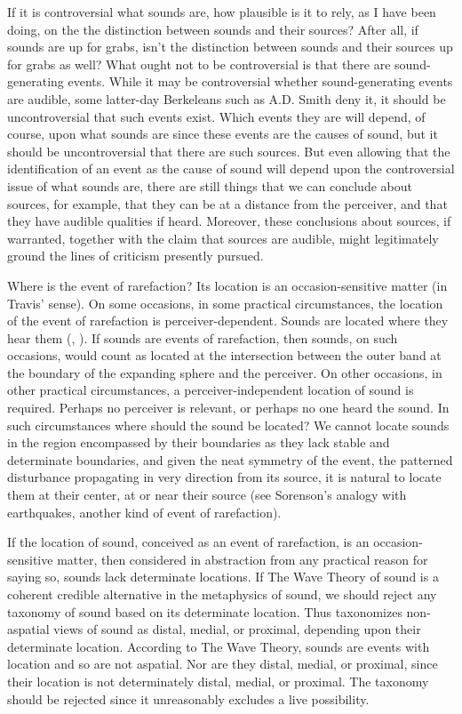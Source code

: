 \documentclass[12pt]{article}
\begin{document}
If it is controversial what sounds are, how plausible is it to rely, as I have been doing, on the the distinction between sounds and their sources? After all, if sounds are up for grabs, isn’t the distinction between sounds and their sources up for grabs as well? What ought not to be controversial is that there are sound-generating events. While it may be controversial whether sound-generating events are audible, some latter-day Berkeleans such as A.D. Smith \citeyearpar{Smith:2002sa} deny it, it should be uncontroversial that such events exist. Which events they are will depend, of course, upon what sounds are since these events are the causes of sound, but it should be uncontroversial that there are such sources. But even allowing that the identification of an event as the cause of sound will depend upon the controversial issue of what sounds are, there are still things that we can conclude about sources, for example, that they can be at a distance from the perceiver, and that they have audible qualities if heard. Moreover, these conclusions about sources, if warranted, together with the claim that sources are audible, might legitimately ground the lines of criticism presently pursued. 

Where is the event of rarefaction? Its location is an occasion-sensitive matter (in Travis' \citeyear{Travis:2008la} sense). On some occasions, in some practical circumstances, the location of the event of rarefaction is perceiver-dependent. Sounds are located where they hear them (\citealt{Nudds:2009sf}, \citealt{OShaughnessy:2009aa}). If sounds are events of rarefaction, then sounds, on such occasions, would count as located at the intersection between the outer band at the boundary of the expanding sphere and the perceiver. On other occasions, in other practical circumstances, a perceiver-independent location of sound is required. Perhaps no perceiver is relevant, or perhaps no one heard the sound. In such circumstances where should the sound be located? We cannot locate sounds in the region encompassed by their boundaries as they lack stable and determinate boundaries, and given the neat symmetry of the event, the patterned disturbance propagating in very direction from its source, it is natural to locate them at their center, at or near their source (see Sorenson's \citeyear{Sorensen:2009aa} analogy with earthquakes, another kind of event of rarefaction).

If the location of sound, conceived as an event of rarefaction, is an occasion-sensitive matter, then considered in abstraction from any practical reason for saying so, sounds lack determinate locations. If The Wave Theory of sound is a coherent credible alternative in the metaphysics of sound, we should reject any taxonomy of sound based on its determinate location. Thus \citet{Casati:2014hw} taxonomizes non-aspatial views of sound as distal, medial, or proximal, depending upon their determinate location. According to The Wave Theory, sounds are events with location and so are not aspatial. Nor are they distal, medial, or proximal, since their location is not determinately distal, medial, or proximal. The taxonomy should be rejected since it unreasonably excludes a live possibility.
\end{document}
